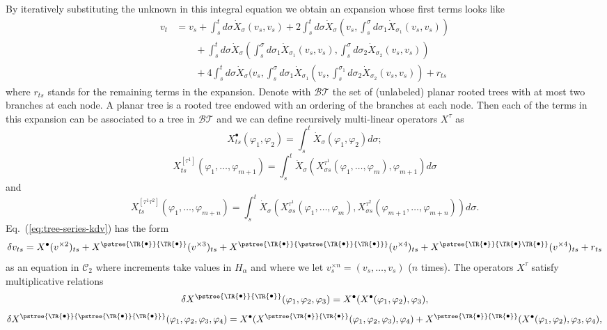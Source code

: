 \documentclass[a4paper]{article}
\newcommand{\1}{{\bf 1}}
\newcommand{\der}{\delta}
\newcommand{\CC}{\mathcal{C}}
\newcommand{\BT}{\mathcal{BT}}
\newcommand{\troot}{\bullet}
\newcommand{\tsnode}{\TR{\raisebox{0.5pt}{\ensuremath{\scriptstyle\bullet}}}}
\newcommand{\tsroot}{\ensuremath{\scriptstyle\bullet}}
\newcommand{\aaabbb}{\pstree{\tsnode}{\pstree{\tsnode}{\tsnode}}}
\newcommand{\aabb}{\pstree{\tsnode}{\tsnode}}
\newcommand{\aababb}{\pstree{\tsnode}{\tsnode \tsnode}}
\newcommand{\smalltrees}{\psset{levelsep=-5pt,nodesep=-2pt,treesep=1pt}}
\newcommand{\CC}{\mathcal{C}}
\newcommand{\der}{\delta}
\begin{document}
By iteratively substituting the unknown in this integral equation we
obtain an expansion whose first terms looks like
\begin{equation}
\label{eq:tree-series-kdv}
  \begin{split}
v_t & = v_s + \int_s^t d\sigma \dot X_\sigma(v_s,v_s)
+ 2 \int_s^t d\sigma \dot X_\sigma(v_s,\int_s^\sigma d\sigma_1 \dot
X_{\sigma_1}(v_s,v_s))
\\ &\qquad +\int_s^t d\sigma \dot X_\sigma(\int_s^\sigma d\sigma_1 \dot X_{\sigma_1}(v_s,v_s),\int_s^\sigma d\sigma_2 \dot X_{\sigma_2}(v_s,v_s))    
\\ &\qquad +4 \int_s^t d\sigma \dot X_\sigma(v_s,\int_s^\sigma
d\sigma_1 \dot X_{\sigma_1}(v_s,\int_s^{\sigma_1} d\sigma_2 \dot
X_{\sigma_2}(v_s,v_s))  + r_{ts}  
  \end{split}
\end{equation}
where $r_{ts}$ stands for the remaining terms in
the expansion. Denote with $\BT$ the set of (unlabeled) planar rooted
trees with at most two branches at each node. A planar tree is a
rooted tree endowed with an ordering of the branches at each node. 
Then each of the terms in this expansion can be associated
to a tree in $\BT$  and we can define recursively
multi-linear operators $X^{\tau}$ as
$$
X^{\troot}_{ts}(\varphi_1,\varphi_2) = \int_s^t \dot
X_\sigma(\varphi_1,\varphi_2) d\sigma;
$$ 
$$
X^{[\tau^1]}_{ts}(\varphi_1,\dots,\varphi_{m+1}) = \int_s^t \dot
X_\sigma(X^{\tau^1}_{\sigma
  s}(\varphi_1,\dots,\varphi_m),\varphi_{m+1})
 d\sigma
$$
and
$$
X^{[\tau^1 \tau^2]}_{ts}(\varphi_1,\dots,\varphi_{m+n}) = \int_s^t \dot
X_\sigma(X^{\tau^1}_{\sigma s}(\varphi_1,\dots,\varphi_m),X^{\tau^2}_{\sigma s}(\varphi_{m+1},\dots,\varphi_{m+n})) d\sigma.
$$
Eq.~(\ref{eq:tree-series-kdv}) has the form
\smalltrees
\begin{equation}
  \label{eq:kdv-incr-1}
\der v_{ts} = X^{\tsroot}(v^{\times 2})_{ts} + X^{\aabb}(v^{\times 3})_{ts} +
X^{\aaabbb}(v^{\times 4})_{ts} +  X^{\aababb}(v^{\times 4})_{ts} +r_{ts}  
\end{equation}
as an equation in $\CC_2$ where increments take values in $H_\alpha$ and where we let $v^{\times n}_s =
(v_s,\dots,v_s)$ ($n$ times). The operators $X^\tau$ satisfy multiplicative relations 
$$
\der X^{\aabb}(\varphi_1,\varphi_2,\varphi_3) = X^{\tsroot}(X^{\tsroot}(\varphi_1,\varphi_2),\varphi_3) ,
$$
$$
\der X^{\aaabbb}(\varphi_1,\varphi_2,\varphi_3,\varphi_4) =
X^{\tsroot}(X^{\aabb}(\varphi_1,\varphi_2,\varphi_3),\varphi_4) + X^{\aabb}(X^{\tsroot}(\varphi_1,\varphi_2),\varphi_3,\varphi_4) ,
$$
\end{document}
